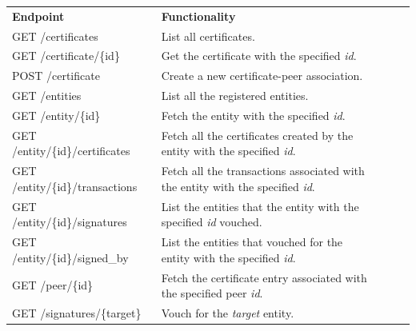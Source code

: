 {\renewcommand{\arraystretch}{2}%
\begin{table}[h]
  \centering
  \begin{tabular}{|l|l|lll}
    \cline{1-2}
    \textbf{Endpoint}               & \textbf{Functionality} &  &  &  \\ \cline{1-2}
    GET /certificates               & List all certificates.                      &  &  &  \\  \cline{1-2}

    GET /certificate/\{id\}         & Get the certificate with the specified \textit{id}.                      &  &  &  \\ \cline{1-2}

    POST /certificate               & Create a new certificate-peer association.                      &  &  &  \\ \cline{1-2}

    GET /entities                   & List all the registered entities.                      &  &  &  \\ \cline{1-2}

    GET /entity/\{id\}              & Fetch the entity with the specified \textit{id}.                      &  &  &  \\ \cline{1-2}

    GET /entity/\{id\}/certificates & Fetch all the certificates created by the entity with the specified \textit{id}.                      &  &  &  \\ \cline{1-2}

    GET /entity/\{id\}/transactions & Fetch all the transactions associated with the entity with the specified \textit{id}.                      &  &  &  \\ \cline{1-2}

    GET /entity/\{id\}/signatures   & List the entities that the entity with the specified \textit{id} vouched.                      &  &  &  \\ \cline{1-2}

    GET /entity/\{id\}/signed\_by   & List the entities that vouched for the entity with the specified \textit{id}.                      &  &  &  \\ \cline{1-2}

    GET /peer/\{id\}                & Fetch the certificate entry associated with the specified peer \textit{id}.                       &  &  &  \\ \cline{1-2}

    GET /signatures/\{target\}      & Vouch for the \textit{target} entity.                      &  &  &  \\ \cline{1-2}


\end{tabular}
\end{table}}
